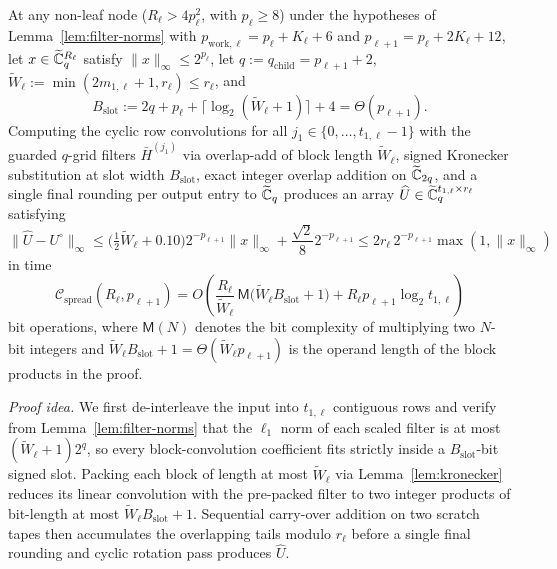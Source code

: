 \begin{theorem}\label{thm:spread}
At any non-leaf node ($R_\ell > 4 p_\ell^2$, with $p_\ell \ge 8$) under the hypotheses of Lemma~\ref{lem:filter-norms} with $p_{\mathrm{work},\ell} = p_\ell + K_\ell + 6$ and $p_{\ell+1} = p_\ell + 2 K_\ell + 12$, let $x \in \widetilde{\mathbb{C}}_q^{R_\ell}$ satisfy $\|x\|_\infty \le 2^{p_\ell}$, let $q := q_{\mathrm{child}} = p_{\ell+1} + 2$, $\tilde{W}_\ell := \min(2m_{1,\ell}+1, r_\ell) \le r_\ell$, and
\begin{equation}\label{eq:slot-width}
  B_{\mathrm{slot}} := 2q + p_\ell + \lceil \log_2(\tilde{W}_\ell + 1) \rceil + 4 = \Theta(p_{\ell+1}).
\end{equation}
Computing the cyclic row convolutions for all $j_1 \in \{0, \dots, t_{1,\ell}-1\}$ with the guarded $q$-grid filters $\bar{H}^{(j_1)}$ via overlap-add of block length $\tilde{W}_\ell$, signed Kronecker substitution at slot width $B_{\mathrm{slot}}$, exact integer overlap addition on $\widetilde{\mathbb{C}}_{2q}$, and a single final rounding per output entry to $\widetilde{\mathbb{C}}_q$ produces an array $\widehat{U} \in \widetilde{\mathbb{C}}_q^{t_{1,\ell} \times r_\ell}$ satisfying
\begin{equation}\label{eq:spread-err}
  \|\widehat{U} - U^\circ\|_\infty \le \bigl(\tfrac{1}{2}\tilde{W}_\ell + 0.10\bigr) 2^{-p_{\ell+1}}\|x\|_\infty + \frac{\sqrt{2}}{8} 2^{-p_{\ell+1}} \le 2 r_\ell \, 2^{-p_{\ell+1}} \max(1, \|x\|_\infty)
\end{equation}
in time
\begin{equation}\label{eq:spread-cost}
  \mathcal{C}_{\mathrm{spread}}(R_\ell, p_{\ell+1}) = O\!\left(\frac{R_\ell}{\tilde{W}_\ell} \, \mathsf{M}\bigl(\tilde{W}_\ell B_{\mathrm{slot}} + 1\bigr) + R_\ell p_{\ell+1} \log_2 t_{1,\ell}\right)
\end{equation}
bit operations, where $\mathsf{M}(N)$ denotes the bit complexity of multiplying two $N$-bit integers and $\tilde{W}_\ell B_{\mathrm{slot}} + 1 = \Theta(\tilde{W}_\ell p_{\ell+1})$ is the operand length of the block products in the proof.
\end{theorem}

\noindent\emph{Proof idea.} We first de-interleave the input into $t_{1,\ell}$ contiguous rows and verify from Lemma~\ref{lem:filter-norms} that the $\ell_1$ norm of each scaled filter is at most $(\tilde{W}_\ell + 1)2^q$, so every block-convolution coefficient fits strictly inside a $B_{\mathrm{slot}}$-bit signed slot. Packing each block of length at most $\tilde{W}_\ell$ via Lemma~\ref{lem:kronecker} reduces its linear convolution with the pre-packed filter to two integer products of bit-length at most $\tilde{W}_\ell B_{\mathrm{slot}} + 1$. Sequential carry-over addition on two scratch tapes then accumulates the overlapping tails modulo $r_\ell$ before a single final rounding and cyclic rotation pass produces $\widehat{U}$.

